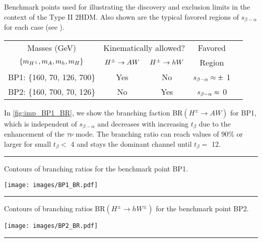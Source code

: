 \begin{table}
  \begin{sidecaption}{Benchmark points used for illustrating the discovery and exclusion limits in the context of the Type II $2$HDM. Also shown are the typical favored regions of $s_{\beta-\alpha}$ for each case (see \cite{Coleppa:2013dya}). } 
\begin{center}
 \begin{tabular}{ccccl}
 \toprule
 Masses (GeV) & \multicolumn{2}{c}{Kinematically allowed?} & Favored\\ \cmidrule{2-3}
 $\left\{ {m_{H^{\pm}},m_{A},m_{h},m_{H}}\right\}$ & $H^{\pm}\rightarrow A W$ & $H^{\pm}\rightarrow h W$ & Region\\\midrule
  BP1: \{160, 70, 126, 700\} & Yes & No & $s_{\beta-\alpha}\approx\pm$ 1 \\ \midrule
 BP2: \{160, 700, 70, 126\} & No & Yes & $s_{\beta-\alpha}\approx$ 0 \\
 \bottomrule
 \end{tabular}
\end{center}
\end{sidecaption}
\label{tab:classification}
\end{table}


In \autoref{fig:imp_BP1_BR}, we show the branching faction BR$(H^{\pm} \rightarrow AW)$ for BP1, which is independent of $s_{\beta-\alpha}$ and decreases with increasing $t_{\beta}$ due to the enhancement of the $\tau\nu$ mode. The branching ratio can reach values of 90\% or larger for small $t_{\beta}<$ 4 and stays the dominant channel until $t_{\beta}=$ 12. 

\begin{marginfigure}[-3in]
 {\color{gray}\hrule}
 \vspace{\onelineskip}
 \caption{Contours of branching ratios for the benchmark point BP1.}
 \texttt{[image: images/BP1\_BR.pdf]}
\label{fig:imp_BP1_BR}
\end{marginfigure}

\begin{marginfigure}[-0.5cm]
 \centering
 {\color{gray}\hrule}
 \vspace{\onelineskip}
\caption{Contours of branching ratios BR$(H^\pm\rightarrow hW^\pm)$ for the benchmark point BP2.}
\texttt{[image: images/BP2\_BR.pdf]}
\vspace{\onelineskip}
{\color{gray}\hrule}
\label{fig:imp_BP2_BR}
\end{marginfigure}

